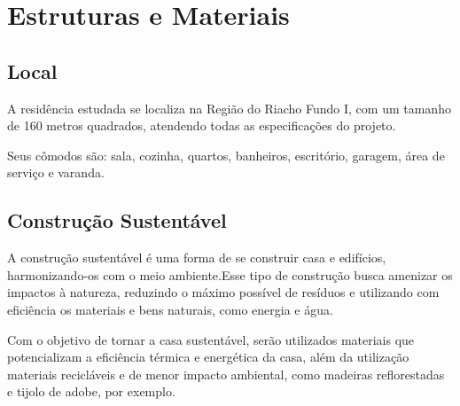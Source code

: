     \section{Estruturas e Materiais}
        \subsection{Local}
            \par A residência estudada se localiza na Região do Riacho Fundo I, com um tamanho de 160 metros quadrados, atendendo todas as especificações do projeto.
            \par Seus cômodos são: sala, cozinha, quartos, banheiros, escritório, garagem, área de serviço e varanda.

        \subsection{Construção Sustentável}
            \par A construção sustentável é uma forma de se construir casa e edifícios, harmonizando-os com o meio ambiente.Esse tipo de construção busca amenizar os impactos à natureza, reduzindo o máximo possível de resíduos e utilizando com eficiência os materiais e bens naturais, como energia e água. \cite{ecycle}
	        \par Com o objetivo de tornar a casa sustentável, serão utilizados materiais que potencializam a eficiência térmica e energética da casa, além da utilização materiais recicláveis e de menor impacto ambiental, como madeiras reflorestadas e tijolo de adobe, por exemplo.
